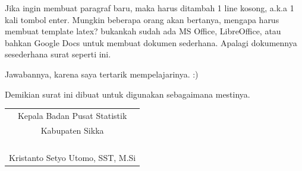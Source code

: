 \documentclass{article}
\begin{document}
Jika ingin membuat paragraf baru, maka harus ditambah 1 line kosong, a.k.a 1 kali tombol enter.
Mungkin beberapa orang akan bertanya, mengapa harus membuat template latex?
bukankah sudah ada MS Office, LibreOffice, atau bahkan Google Docs untuk membuat dokumen sederhana.
Apalagi dokumennya sesederhana surat seperti ini. 


Jawabannya, karena saya tertarik mempelajarinya. :)

Demikian surat ini dibuat untuk digunakan sebagaimana mestinya.

\bigskip %

\bigskip
\hfill
\begin{tabular}{@{}c}
	Kepala Badan Pusat Statistik\\
    Kabupaten Sikka \bigskip\\
    \\
    \\
    \\
    \\
	Kristanto Setyo Utomo, SST, M.Si
\end{tabular}
\end{document}
